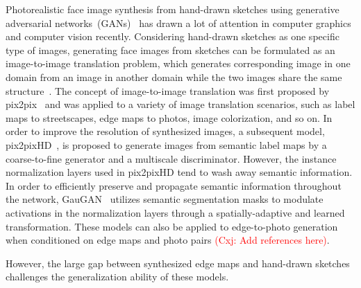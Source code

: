 \documentclass{article}
\newcommand{\cxj}[1]{\textcolor{red}{(Cxj: #1)}}
\begin{document}
Photorealistic face image synthesis from hand-drawn sketches using generative adversarial networks~(GANs)~\cite{gan} has drawn a lot of attention in computer graphics and computer vision recently. Considering hand-drawn sketches as one specific type of images, generating face images from sketches can be formulated as an image-to-image translation problem, which generates corresponding image in one domain from an image in another domain while the two images share the same structure~\cite{cyclegan,bicyclegan,spagan,munit,crn,cfgan,sis,cfgan,maskgan}.
The concept of image-to-image translation was first proposed by pix2pix~\cite{pix2pix} and was applied to a variety of image translation scenarios, such as label maps to streetscapes, edge maps to photos, image colorization, and so on.
In order to improve the resolution of synthesized images, a subsequent model, pix2pixHD~\cite{pix2pixhd}, is proposed to generate images from semantic label maps by a coarse-to-fine generator and a multiscale discriminator. 
However, the instance normalization layers used in pix2pixHD tend to wash away semantic information.
In order to efficiently preserve and propagate semantic information throughout the network, GauGAN~\cite{spade} utilizes semantic segmentation masks to modulate activations in the normalization layers through a spatially-adaptive and learned transformation. 
%
These models can also be applied to edge-to-photo generation when conditioned on edge maps and photo pairs \cite{} \cxj{Add references here}. 

However, the large gap between synthesized edge maps and hand-drawn sketches challenges the generalization ability of these models.
\end{document}
